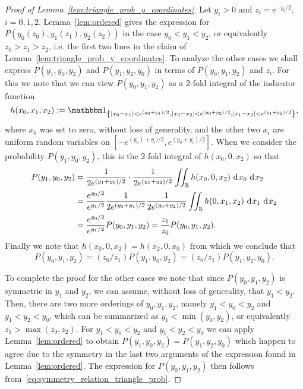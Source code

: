 \begin{proof}[Proof of Lemma~\ref{lem:triangle_prob_y_coordinates}]
Let $y_i >0$ and $z_i = e^{-y_i/2}$, $i=0,1,2$. Lemma~\ref{lem:ordered} gives the expression for $P(y_0(z_0),y_1(z_1),y_2(z_2))$ in the case $y_0<y_1<y_2$, or equivalently $z_0>z_1>z_2$, i.e. the first two lines in the claim of Lemma~\ref{lem:triangle_prob_y_coordinates}. To analyze the other cases we shall express $P(y_1,y_0,y_2)$ and $P(y_1,y_2,y_0)$ in terms of $P(y_0,y_1,y_2)$ and $z_i$. For this we note that we can view $P(y_0,y_1,y_2)$ as a 2-fold integral of the indicator function
\[ 
	h(x_0, x_1, x_2) := \ind{ |x_0 - x_1| < e^{(y_0+y_1)/2}, |x_0 - x_2| < e^{(y_0+y_2)/2}, |x_1-x_2| < e^{(y_1+y_2)/2}}, 
\]
where $x_0$ was set to zero, without loss of generality, and the other two $x_i$ are uniform random variables on $[-e^{(y_0)+y_i)/2}, e^{(y_0+y_i)/2}]$. When we consider the probability $P(y_1,y_0,y_2)$, this is the 2-fold integral of $h(x_0,0,x_2)$ so that
\begin{align*}
	P(y_1,y_0,y_2) &= \frac{1}{2e^{(y_1+y_0)/2}} \cdot \frac{1}{2e^{(y_1+y_2)/2}} 
		\iint_{{\mathbb R}} h(x_0,0,x_2) \operatorname{\, \mathrm{d}\hspace{-1pt}} x_0 \operatorname{\, \mathrm{d}\hspace{-1pt}} x_2\\
	&= \frac{e^{y_0/2}}{e^{y_1/2}} \frac{1}{2e^{(y_0+y_1)/2}} \frac{1}{2e^{(y_0+y_2)/2}} 
		\iint_{{\mathbb R}} h(0,x_1,x_2) \operatorname{\, \mathrm{d}\hspace{-1pt}} x_1 \operatorname{\, \mathrm{d}\hspace{-1pt}} x_2\\
	&= \frac{e^{y_0/2}}{e^{y_1/2}} P(y_0,y_1,y_2) = \frac{z_1}{z_0}  P(y_0,y_1,y_2).
\end{align*}
Finally we note that $h(x_0,0,x_2) = h(x_2,0,x_0)$ from which we conclude that
\begin{equation}\label{eq:symmetry_relation_triangle_prob}
	P(y_0, y_1, y_2) = \left(z_0/z_1\right) P(y_1,y_0,y_2) = \left(z_0/z_1\right) P(y_1,y_2,y_0).
\end{equation}

To complete the proof for the other cases we note that since $P(y_0,y_1,y_2)$ is symmetric in $y_1$ and $y_2$, we can assume, without loss of generality, that $y_1 < y_2$. Then, there are two more orderings of $y_0, y_1, y_2$, namely $y_1< y_0< y_2$ and $y_1<y_2<y_0$, which can be summarized as $y_1 < \min (y_0,y_2)$, or equivalently $z_1 > \max(z_0,z_2)$. For $y_1 < y_0 < y_2$ and $y_1 < y_2<y_0$ we can apply Lemma~\ref{lem:ordered} to obtain $P(y_1,y_0,y_2) = P(y_1,y_2,y_0)$ which happen to agree due to the symmetry in the last two arguments of the expression found in Lemma~\ref{lem:ordered}. The expression for $P(y_0,y_1,y_2)$ then follows from~\eqref{eq:symmetry_relation_triangle_prob}.
\end{proof}

